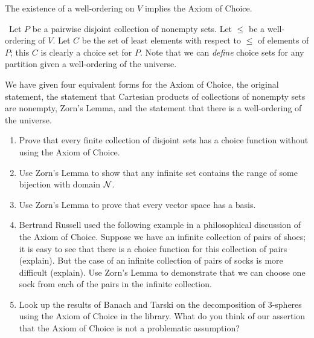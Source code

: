 \begin{thm}
 The existence of a well-ordering on $V$ implies the
 Axiom of Choice.
\end{thm}

\preuve\ Let $P$ be a pairwise disjoint collection of nonempty
sets.
Let $\leq$ be a well-ordering of $V$.  Let $C$ be the set of least
elements with respect to $\leq$ of elements of $P$; this $C$ is
clearly a choice set for $P$.  Note that we can {\itshape define\/} choice
sets for any partition given a well-ordering of the
universe.\linebreak
\finpreuve

We have given four equivalent forms for the Axiom of Choice,
the original statement, the statement that Cartesian
products of collections of nonempty sets are nonempty, Zorn's
Lemma, and the statement that there is a
well-ordering of the universe.

\Exercises

\begin{enumerate}
 \item  Prove that every finite collection of
   disjoint sets has a choice function
   without using the Axiom of Choice.

 \item  Use Zorn's Lemma to show that any infinite set
   contains the range of some bijection with
   domain $\cal N$.

 \item  Use Zorn's Lemma to prove that every vector space
   has a basis.

 \item  Bertrand Russell used the following example in a philosophical
   discussion of the Axiom of Choice.  Suppose we have
   an infinite collection of pairs of shoes; it is easy to see that there is a
   choice function for this collection of pairs (explain).  But the case of an
   infinite collection of pairs of socks is more difficult (explain).  Use
   Zorn's Lemma to demonstrate that we can choose one sock from each of the
   pairs in the infinite collection.

 \item  Look up the results of Banach and Tarski on the decomposition of
   3-spheres using the Axiom of Choice in the library.
   What do you think of our assertion that the Axiom of Choice is not a
   problematic assumption?
\end{enumerate}
                                   
